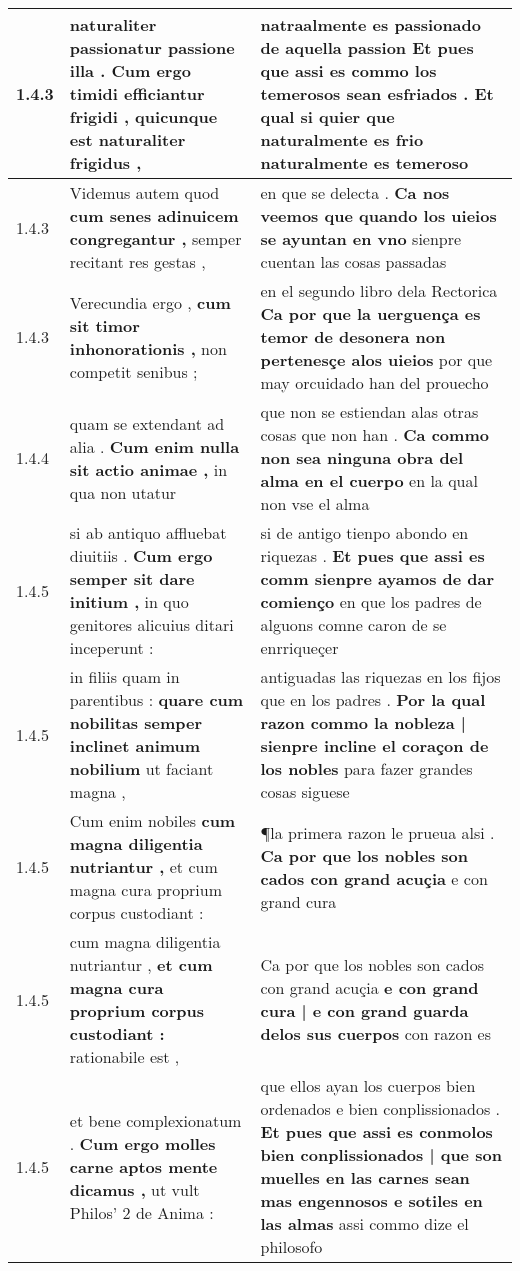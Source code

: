 \begin{tabular}{|p{1cm}|p{6.5cm}|p{6.5cm}|}
1.4.3 & naturaliter passionatur passione illa . \textbf{ Cum ergo timidi efficiantur frigidi , } quicunque est naturaliter frigidus , & natraalmente es passionado de aquella passion \textbf{ Et pues que assi es commo los temerosos sean esfriados . } Et qual si quier que naturalmente es frio naturalmente es temeroso \\\hline
1.4.3 & Videmus autem quod \textbf{ cum senes adinuicem congregantur , } semper recitant res gestas , & en que se delecta . \textbf{ Ca nos veemos que quando los uieios se ayuntan en vno } sienpre cuentan las cosas passadas \\\hline
1.4.3 & Verecundia ergo , \textbf{ cum sit timor inhonorationis , } non competit senibus ; & en el segundo libro dela Rectorica \textbf{ Ca por que la uerguença es temor de desonera non pertenesçe alos uieios } por que may orcuidado han del prouecho \\\hline
1.4.4 & quam se extendant ad alia . \textbf{ Cum enim nulla sit actio animae , } in qua non utatur & que non se estiendan alas otras cosas que non han . \textbf{ Ca commo non sea ninguna obra del alma en el cuerpo } en la qual non vse el alma \\\hline
1.4.5 & si ab antiquo affluebat diuitiis . \textbf{ Cum ergo semper sit dare initium , } in quo genitores alicuius ditari inceperunt : & si de antigo tienpo abondo en riquezas . \textbf{ Et pues que assi es comm sienpre ayamos de dar comienço } en que los padres de alguons comne caron de se enrriqueçer \\\hline
1.4.5 & in filiis quam in parentibus : \textbf{ quare cum nobilitas semper inclinet animum nobilium } ut faciant magna , & antiguadas las riquezas en los fijos que en los padres . \textbf{ Por la qual razon commo la nobleza | sienpre incline el coraçon de los nobles } para fazer grandes cosas siguese \\\hline
1.4.5 & Cum enim nobiles \textbf{ cum magna diligentia nutriantur , } et cum magna cura proprium corpus custodiant : & ¶la primera razon le prueua alsi . \textbf{ Ca por que los nobles son cados con grand acuçia } e con grand cura \\\hline
1.4.5 & cum magna diligentia nutriantur , \textbf{ et cum magna cura proprium corpus custodiant : } rationabile est , & Ca por que los nobles son cados con grand acuçia \textbf{ e con grand cura | e con grand guarda delos sus cuerpos } con razon es \\\hline
1.4.5 & et bene complexionatum . \textbf{ Cum ergo molles carne aptos mente dicamus , } ut vult Philos’ 2 de Anima : & que ellos ayan los cuerpos bien ordenados e bien conplissionados . \textbf{ Et pues que assi es conmolos bien conplissionados | que son muelles en las carnes sean mas engennosos e sotiles en las almas } assi commo dize el philosofo \\\hline

\end{tabular}
